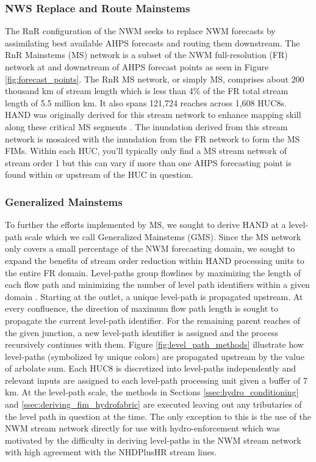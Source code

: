 \subsubsection{NWS Replace and Route Mainstems}
\label{sssec:replace_and_route_mainstems}
%
The RnR configuration of the NWM seeks to replace NWM forecasts by assimilating best available AHPS forecasts and routing them downstream.
The RnR Mainstems (MS) network is a subset of the NWM full-resolution (FR) network at and downstream of AHPS forecast points as seen in Figure \ref{fig:forecast_points}.
The RnR MS network, or simply MS, comprises about 200 thousand km of stream length which is less than 4\% of the FR total stream length of 5.5 million km.
It also spans 121,724 reaches across 1,608 HUC8s.
HAND was originally derived for this stream network to enhance mapping skill along these critical MS segments \cite{djokic2019arc}. 
The inundation derived from this stream network is mosaiced with the inundation from the FR network to form the MS FIMs. 
Within each HUC, you'll typically only find a MS stream network of stream order 1 but this can vary if more than one AHPS forecasting point is found within or upstream of the HUC in question.
%
\subsubsection{Generalized Mainstems}
\label{sssec:generalized_mainstems}
%
To further the efforts implemented by MS, we sought to derive HAND at a level-path scale which we call Generalized Mainstems (GMS).
Since the MS network only covers a small percentage of the NWM forecasting domain, we sought to expand the benefits of stream order reduction within HAND processing units to the entire FR domain.
Level-paths group flowlines by maximizing the length of each flow path and minimizing the number of level path identifiers within a given domain \cite{moore2019user,mckay2012nhdplus}. 
Starting at the outlet, a unique level-path is propagated upstream. 
At every confluence, the direction of maximum flow path length is sought to propagate the current level-path identifier.
For the remaining parent reaches of the given junction, a new level-path identifier is assigned and the process recursively continues with them.
Figure \ref{fig:level_path_methods} illustrate how level-paths (symbolized by unique colors) are propagated upstream by the value of arbolate sum.
Each HUC8 is discretized into level-paths independently and relevant inputs are assigned to each level-path processing unit given a buffer of 7 km.
At the level-path scale, the methods in Sections \ref{ssec:hydro_conditioning} and \ref{ssec:deriving_fim_hydrofabric} are executed leaving out any tributaries of the level path in question at the time.
The only exception to this is the use of the NWM stream network directly for use with hydro-enforcement which was motivated by the difficulty in deriving level-paths in the NWM stream network with high agreement with the NHDPlusHR stream lines.

